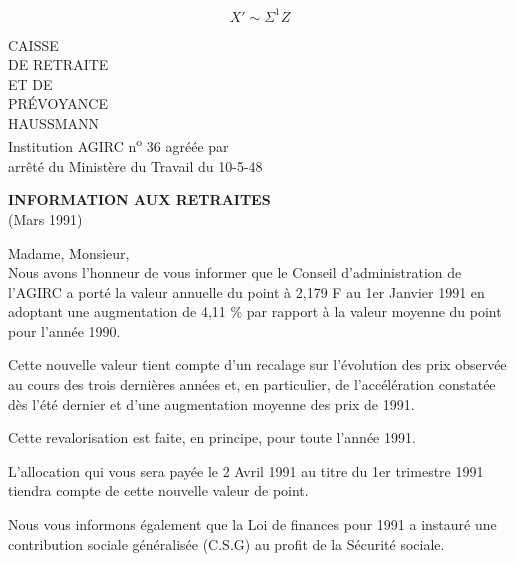 \[
 X'\sim\Sigma^1 Z
\]

CAISSE\\
DE RETRAITE\\
ET DE\\
PRÉVOYANCE\\
HAUSSMANN\\
Institution AGIRC n\textsuperscript{o} 36 agréée par\\
arrêté du Ministère du Travail du 10-5-48

\textbf{INFORMATION AUX RETRAITES}\\
(Mars 1991)

Madame, Monsieur,\\

Nous avons l'honneur de vous informer que le Conseil d'administration de l'AGIRC a porté la valeur annuelle du point à 2,179 F au 1er Janvier 1991 en adoptant une augmentation de 4,11 \% par rapport à la valeur moyenne du point pour l'année 1990.

Cette nouvelle valeur tient compte d'un recalage sur l'évolution des prix observée au cours des trois dernières années et, en particulier, de l'accélération constatée dès l'été dernier et d'une augmentation moyenne des prix de 1991.

Cette revalorisation est faite, en principe, pour toute l'année 1991.

L'allocation qui vous sera payée le 2 Avril 1991 au titre du 1er trimestre 1991 tiendra compte de cette nouvelle valeur de point.

Nous vous informons également que la Loi de finances pour 1991 a instauré une contribution sociale généralisée (C.S.G) au profit de la Sécurité sociale.

